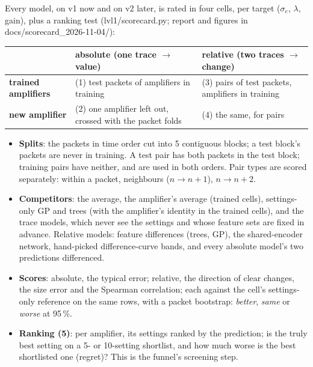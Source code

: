 \documentclass[11pt]{article}
\begin{document}
Every model, on v1 now and on v2 later, is rated in four cells, per target ($\sigma_e$, $\lambda$, gain), plus a
ranking test (lvl1/scorecard.py; report and figures in docs/scorecard\_2026-11-04/):
\begin{center}\small
\begin{tabular}{p{3.2cm}p{5.4cm}p{5.4cm}}\toprule
& \textbf{absolute} (one trace $\to$ value) & \textbf{relative} (two traces $\to$ change)\\\midrule
\textbf{trained amplifiers} & (1) test packets of amplifiers in training & (3) pairs of test packets, amplifiers in training\\
\textbf{new amplifier} & (2) one amplifier left out, crossed with the packet folds & (4) the same, for pairs\\\bottomrule
\end{tabular}
\end{center}
\begin{itemize}
\item \textbf{Splits}: the packets in time order cut into 5 contiguous blocks; a test block's packets are never in
  training. A test pair has both packets in the test block; training pairs have neither, and are used in both orders.
  Pair types are scored separately: within a packet, neighbours ($n\to n+1$), $n\to n+2$.
\item \textbf{Competitors}: the average, the amplifier's average (trained cells), settings-only GP and trees (with the
  amplifier's identity in the trained cells), and the trace models, which never see the settings and whose feature sets
  are fixed in advance. Relative models: feature differences (trees, GP), the shared-encoder network, hand-picked
  difference-curve bands, and every absolute model's two predictions differenced.
\item \textbf{Scores}: absolute, the typical error; relative, the direction of clear changes, the size error and the
  Spearman correlation; each against the cell's settings-only reference on the same rows, with a packet bootstrap:
  \emph{better}, \emph{same} or \emph{worse} at 95\,\%.
\item \textbf{Ranking (5)}: per amplifier, its settings ranked by the prediction; is the truly best setting on a 5- or
  10-setting shortlist, and how much worse is the best shortlisted one (regret)? This is the funnel's screening step.
\end{itemize}
\end{document}
